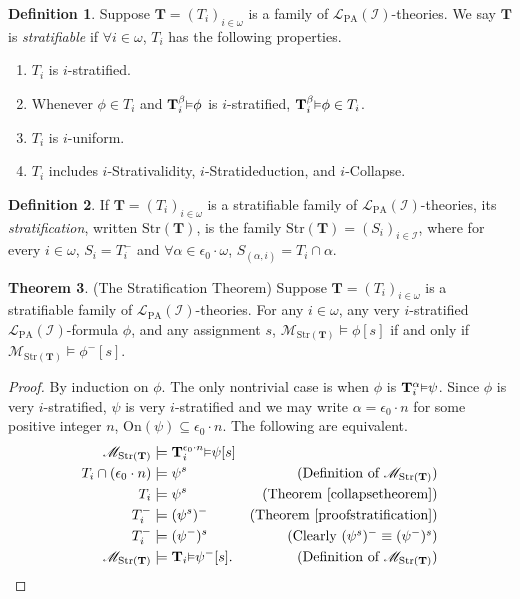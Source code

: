 \documentclass[reqno]{article}
\theoremstyle{definition}
\newtheorem{theorem}{Theorem}
\newtheorem{definition}[theorem]{Definition}
\def\L{\mathscr{L}}
\def\M{\mathscr{M}}
\def\T{\mathbf{T}}
\def\LPA{\L_{\mathrm{PA}}}
\def\epom{\epsilon_0\cdot\omega}
\def\indset{\mathcal I}
\def\onset{\mathrm{On}}
\renewcommand{\Pr}[1]{\T_{#1}\mbox{\small${\vDash}$}}
\newcommand{\Prr}[2]{\T^{#1}_{#2}\mbox{\small${\vDash}$}}
\newcommand{\str}[1]{\mathrm{Str}(#1)} \newcommand{\Str}[1]{\str{#1}}
\begin{document}
\begin{definition}
Suppose $\T=(T_i)_{i\in\omega}$ is a family of $\LPA(\indset)$-theories.
We say $\T$ is \emph{stratifiable}
if $\forall i\in\omega$, $T_i$ has the following properties.
\begin{enumerate}
\item $T_i$ is $i$-stratified.
%
%
%
%
\item Whenever $\phi\in T_i$ and $\Prr\beta i\phi$ is $i$-stratified, $\Prr\beta i\phi\in T_i$.
\item $T_i$ is $i$-uniform.
\item $T_i$ includes $i$-Strativalidity, $i$-Stratideduction, and $i$-Collapse.
\end{enumerate}
\end{definition}

\begin{definition}
\label{stratdefn}
If $\T=(T_i)_{i\in\omega}$ is a stratifiable family of $\LPA(\indset)$-theories,
its
\emph{stratification}, written $\str{\T}$,
is the family $\str{\T}=(S_i)_{i\in\indset}$, where for every $i\in\omega$,
$S_i=T^-_i$ and $\forall\alpha\in\epom$, $S_{(\alpha,i)}=T_i\cap\alpha$.
\end{definition}


\begin{theorem}
\label{stratificationtheorem}
(The Stratification Theorem)
Suppose $\T=(T_i)_{i\in\omega}$ is a stratifiable family of $\LPA(\indset)$-theories.
For any $i\in\omega$, any very $i$-stratified 
$\LPA(\indset)$-formula $\phi$, and any assignment $s$,
$\M_{\str{\T}}\models\phi[s]$
if and only if $\M_{\str{\T}}\models\phi^-[s]$.
\end{theorem}

\begin{proof}
By induction on $\phi$.  The only nontrivial case is
when $\phi$ is $\Prr\alpha i\psi$.
Since $\phi$ is very $i$-stratified, $\psi$ is very $i$-stratified and we may write
$\alpha=\epsilon_0\cdot n$
for some positive integer $n$,
$\onset(\psi)\subseteq\epsilon_0\cdot n$.
The following are equivalent.
\begin{align*}
\M_{\str{\T}} &\models \Prr{\epsilon_0\cdot n}i\psi[s]\\
T_i\cap(\epsilon_0\cdot n) &\models \psi^s
  &\mbox{(Definition of $\M_{\str{\T}}$)}\\
T_i &\models \psi^s
  &\mbox{(Theorem \ref{collapsetheorem})}\\
T^-_i &\models (\psi^s)^-
  &\mbox{(Theorem \ref{proofstratification})}\\
T^-_i &\models (\psi^-)^s
  &\mbox{(Clearly $(\psi^s)^-\equiv(\psi^-)^s$)}\\
\M_{\str{\T}} &\models \Pr i\psi^-[s].
  &\mbox{(Definition of $\M_{\str{\T}}$)}
\end{align*}
\end{proof}
\end{document}
